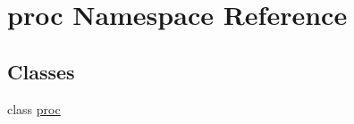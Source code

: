 \hypertarget{namespaceproc}{}\section{proc Namespace Reference}
\label{namespaceproc}
\subsection*{Classes}
\begin{DoxyCompactItemize}
\item 
class \hyperlink{classproc_1_1proc}{proc}
\end{DoxyCompactItemize}
